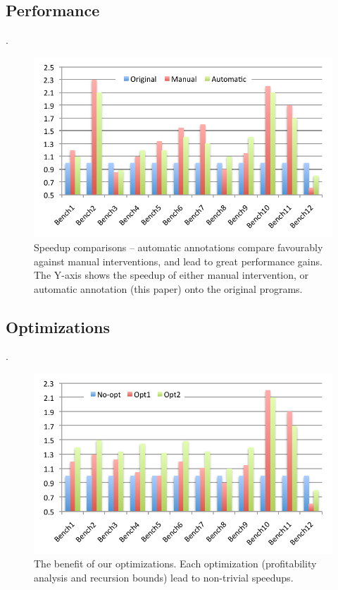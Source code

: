 \documentclass[sigplan,10pt,review,anonymous]{acmart}
\begin{document}
\subsection{Performance}. 

\begin{figure}[t!]
\begin{center}
\includegraphics[width=0.9\columnwidth]{images/Absolute_speedups}
\caption{Speedup comparisons -- automatic annotations compare favourably against
manual interventions, and lead to great performance gains.
The Y-axis shows the speedup of either manual intervention, or automatic
annotation (this paper) onto the original programs.}
\label{fig:Absolute_speedups}
\end{center}
\end{figure}

\subsection{Optimizations}.

\begin{figure}[t!]
\begin{center}
\includegraphics[width=0.9\columnwidth]{images/Opt_Speedups}
\caption{The benefit of our optimizations.
Each optimization (profitability analysis and recursion bounds) lead to
non-trivial speedups.}
\label{fig:Opt_Speedups}
\end{center}
\end{figure}
\end{document}
